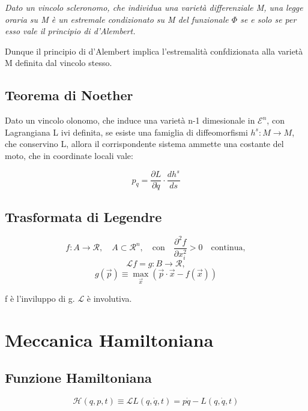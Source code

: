 \documentclass{article}
\begin{document}
            \textit{Dato un vincolo scleronomo, che individua una varietà differenziale M, una legge oraria su M è un estremale condizionato su M del funzionale $\Phi$ se e solo se per esso vale il principio di d'Alembert.}




            Dunque il principio di d'Alembert implica l'estremalità confdizionata alla varietà M definita dal vincolo stesso.

            \subsection{Teorema di Noether}
            Dato un vincolo olonomo, che induce una varietà n-1 dimesionale in $\mathcal{E}^n$, con Lagrangiana L ivi definita, se esiste una famiglia di diffeomorfismi $h^s: M\rightarrow M$, che conservino L, allora il corrispondente sistema ammette una costante del moto, che in coordinate locali vale:

            \begin{equation}
                p_q= \frac{\partial L}{\partial \dot q}\cdot \frac{d h^s}{ds}
            \end{equation}

            \subsection{Trasformata di Legendre}

            \[
                f: A \rightarrow \mathcal{R}, \quad A \subset \mathcal{R}^n, \quad \text{con} \quad \frac{\partial ^2 f}{\partial x_i^2}>0 \quad \text{continua},
            \]
            \[
                \mathcal{L}f = g: B \rightarrow \mathcal{R},
            \]
            \[
                g(\vec{p}) \equiv \max_{\vec{x}} (\vec{p} \cdot \vec{x} - f(\vec{x}))
            \]

            f è l'inviluppo di g.
        $\mathcal{L}$ è involutiva.


            \section{Meccanica Hamiltoniana}

            \subsection{Funzione Hamiltoniana}

            \begin{equation}
                \mathcal{H}(q,p, t)\equiv \mathcal{L}L(q,\dot q, t)= p\dot q- L(q,\dot q, t)
            \end{equation}
\end{document}

